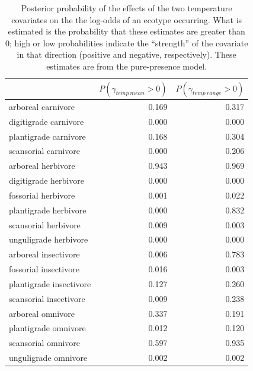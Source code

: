 \documentclass[12pt,letterpaper]{article}
\begin{document}
\begin{table}[ht]
  \centering
  \caption[Posterior probablity of effects of temperature on occurrence]{Posterior probability of the effects of the two temperature covariates on the the log-odds of an ecotype occurring. What is estimated is the probability that these estimates are greater than 0; high or low probabilities indicate the ``strength'' of the covariate in that direction (positive and negative, respectively). These estimates are from the pure-presence model.}
  \label{tab:occur_temp}
  \begin{tabular}{ l r r }
    \hline
    & \(P(\gamma_{temp\ mean} > 0)\) & \(P(\gamma_{temp\ range} > 0)\) \\ 
    \hline
    arboreal carnivore & 0.169 & 0.317 \\ 
    digitigrade carnivore & 0.000 & 0.000 \\ 
    plantigrade carnivore & 0.168 & 0.304 \\ 
    scansorial carnivore & 0.000 & 0.206 \\ 
    arboreal herbivore & 0.943 & 0.969 \\ 
    digitigrade herbivore & 0.000 & 0.000 \\ 
    fossorial herbivore & 0.001 & 0.022 \\ 
    plantigrade herbivore & 0.000 & 0.832 \\ 
    scansorial herbivore & 0.009 & 0.003 \\ 
    unguligrade herbivore & 0.000 & 0.000 \\ 
    arboreal insectivore & 0.006 & 0.783 \\ 
    fossorial insectivore & 0.016 & 0.003 \\ 
    plantigrade insectivore & 0.127 & 0.260 \\ 
    scansorial insectivore & 0.009 & 0.238 \\ 
    arboreal omnivore & 0.337 & 0.191 \\ 
    plantigrade omnivore & 0.012 & 0.120 \\ 
    scansorial omnivore & 0.597 & 0.935 \\ 
    unguligrade omnivore & 0.002 & 0.002 \\ 
    \hline
  \end{tabular}
\end{table}
\end{document}
